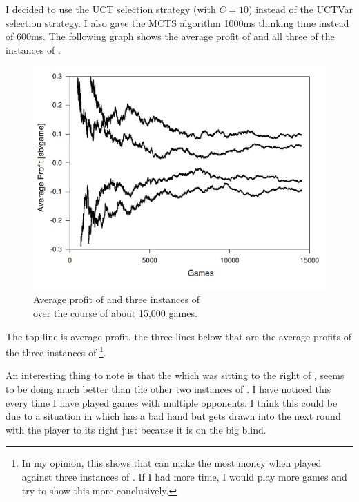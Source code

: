 I decided to use the UCT selection strategy (with \(C = 10\)) instead of the UCTVar selection strategy. I also gave the MCTS algorithm 1000ms thinking time instead of 600ms. The following graph shows the average profit of \mbt and all three of the instances of \sbt.
\begin{figure}[H]
\centering
\includegraphics[width=144mm]{Graphs/SBvMB-x3.png}
\caption{Average profit of \mbt and three instances of \sbt \\ over the course of about 15,000 games.}
\end{figure}

The top line is \mbts average profit, 
the three lines below that are the average profits of the three instances of \sbt\footnote{In my opinion, this shows that \mbt can make the most money when played against three instances of \sbt. If I had more time, I would play more games and try to show this more conclusively.}.

An interesting thing to note is that the \sbt which was sitting to the right of \mbt, seems to be doing much better than the other two instances of \sbt. I have noticed this every time I have played games with multiple opponents. I think this could be due to a situation in which \mbt has a bad hand but gets drawn into the next round with the player to its right just because it is on the big blind.




